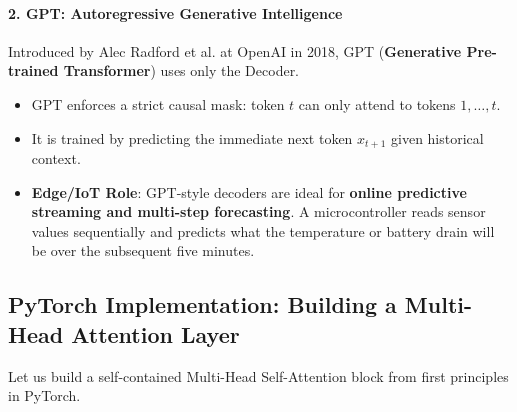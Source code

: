 \paragraph{2. GPT: Autoregressive Generative Intelligence}
Introduced by Alec Radford et al. at OpenAI in 2018, GPT (\textbf{Generative Pre-trained Transformer}) uses only the Decoder.
\begin{itemize}
    \item GPT enforces a strict causal mask: token $t$ can only attend to tokens $1, \dots, t$.
    \item It is trained by predicting the immediate next token $x_{t+1}$ given historical context.
    \item \textbf{Edge/IoT Role}: GPT-style decoders are ideal for \textbf{online predictive streaming and multi-step forecasting}. A microcontroller reads sensor values sequentially and predicts what the temperature or battery drain will be over the subsequent five minutes.
\end{itemize}

\subsection{PyTorch Implementation: Building a Multi-Head Attention Layer}\label{subsec:pytorch_attention}

Let us build a self-contained Multi-Head Self-Attention block from first principles in PyTorch.

